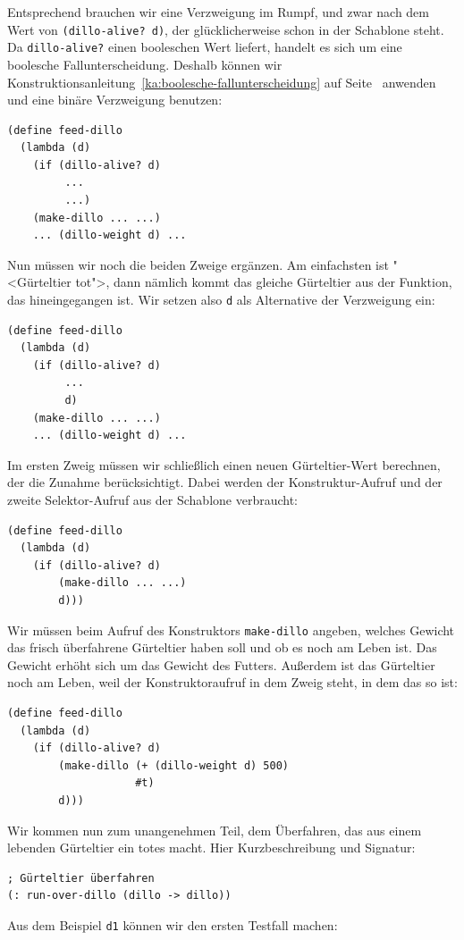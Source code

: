 Entsprechend brauchen wir eine Verzweigung im Rumpf, und zwar nach dem
Wert von \texttt{(dillo-alive? d)}, der glücklicherweise schon in der
Schablone steht.  Da \texttt{dillo-alive?} einen booleschen Wert
liefert, handelt es sich um eine boolesche Fallunterscheidung.
Deshalb 
können wir Konstruktionsanleitung~\ref{ka:boolesche-fallunterscheidung}
auf Seite~\pageref{ka:boolesche-fallunterscheidung} anwenden und eine
binäre Verzweigung benutzen:
%
\begin{verbatim}
(define feed-dillo
  (lambda (d)
    (if (dillo-alive? d)
         ...
         ...)
    (make-dillo ... ...)
    ... (dillo-weight d) ...
\end{verbatim}
%
Nun müssen wir noch die beiden Zweige ergänzen.  Am
einfachsten ist "<Gürteltier tot">, dann nämlich kommt
das gleiche Gürteltier aus der Funktion, das hineingegangen ist.  Wir
setzen also \texttt{d} als Alternative der Verzweigung ein:
%
\begin{verbatim}
(define feed-dillo
  (lambda (d)
    (if (dillo-alive? d)
         ...
         d)
    (make-dillo ... ...)
    ... (dillo-weight d) ...
\end{verbatim}
%
Im ersten Zweig müssen wir schließlich einen neuen Gürteltier-Wert
berechnen, der die Zunahme berücksichtigt.  Dabei werden der
Konstruktur-Aufruf und der zweite Selektor-Aufruf aus der Schablone
verbraucht:
\begin{verbatim}
(define feed-dillo
  (lambda (d)
    (if (dillo-alive? d)
        (make-dillo ... ...)
        d)))
\end{verbatim}
%
Wir müssen beim Aufruf des Konstruktors \texttt{make-dillo} angeben,
welches Gewicht das frisch überfahrene Gürteltier haben soll und ob es
noch am Leben ist.  Das Gewicht erhöht sich um das Gewicht des
Futters.  Außerdem ist das Gürteltier noch am Leben, weil der
Konstruktoraufruf in dem Zweig steht, in dem das so ist:
%
\begin{verbatim}
(define feed-dillo
  (lambda (d)
    (if (dillo-alive? d)
        (make-dillo (+ (dillo-weight d) 500)
                    #t)
        d)))
\end{verbatim}
%
Wir kommen nun zum unangenehmen Teil, dem Überfahren, das aus einem
lebenden Gürteltier ein totes macht.  Hier Kurzbeschreibung und
Signatur:\label{page:run-over-dillo}
%
\begin{verbatim}
; Gürteltier überfahren
(: run-over-dillo (dillo -> dillo))
\end{verbatim}
%
Aus dem Beispiel \texttt{d1} können wir den ersten Testfall machen:
